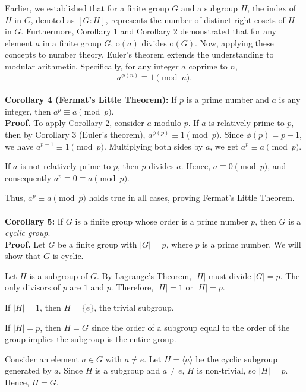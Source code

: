 Earlier, we established that for a finite group \( G \) and a subgroup \( H \), the index of \( H \) in \( G \), denoted as \( [G : H] \), represents the number of distinct right cosets of \( H \) in \( G \). Furthermore, Corollary 1 and Corollary 2 demonstrated that for any element \( a \) in a finite group \( G \), \( \mathrm{o}(a) \) divides \( \mathrm{o}(G) \).
Now, applying these concepts to number theory, Euler's theorem extends the understanding to modular arithmetic. Specifically, for any integer \( a \) coprime to \( n \),
\[ a^{\phi(n)} \equiv 1 \pmod{n}. \]
\\
\textbf{Corollary 4 (Fermat's Little Theorem):} If \( p \) is a prime number and \( a \) is any integer, then \( a^p \equiv a \pmod{p} \).\\
\textbf{Proof.} To apply Corollary 2, consider \( a \) modulo \( p \). If \( a \) is relatively prime to \( p \), then by Corollary 3 (Euler's theorem), \( a^{\phi(p)} \equiv 1 \pmod{p} \). Since \( \phi(p) = p - 1 \), we have \( a^{p-1} \equiv 1 \pmod{p} \). Multiplying both sides by \( a \), we get \( a^p \equiv a \pmod{p} \).

If \( a \) is not relatively prime to \( p \), then \( p \) divides \( a \). Hence, \( a \equiv 0 \pmod{p} \), and consequently \( a^p \equiv 0 \equiv a \pmod{p} \).

Thus, \( a^p \equiv a \pmod{p} \) holds true in all cases, proving Fermat's Little Theorem.
\\\\
\textbf{Corollary 5:} If \( G \) is a finite group whose order is a prime number \( p \), then \( G \) is a \textit{cyclic group}.
\\
\textbf{Proof.} Let \( G \) be a finite group with \( |G| = p \), where \( p \) is a prime number. We will show that \( G \) is cyclic.

Let \( H \) is a subgroup of \( G \). By Lagrange's Theorem, \( |H| \) must divide \( |G| = p \). The only divisors of \( p \) are \( 1 \) and \( p \). Therefore, \( |H| = 1 \) or \( |H| = p \).

If \( |H| = 1 \), then \( H = \{e\} \), the trivial subgroup.

If \( |H| = p \), then \( H = G \) since the order of a subgroup equal to the order of the group implies the subgroup is the entire group.

Consider an element \( a \in G \) with \( a \neq e \). Let \( H = \langle a \rangle \) be the cyclic subgroup generated by \( a \). Since \( H \) is a subgroup and \( a \neq e \), \( H \) is non-trivial, so \( |H| = p \). Hence, \( H = G \).

